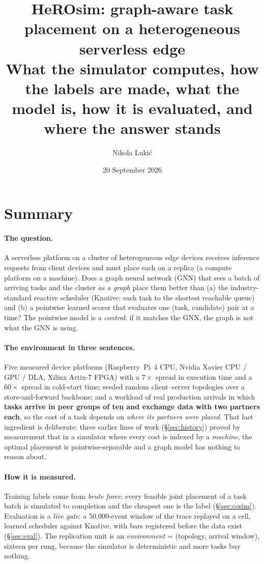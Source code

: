 \documentclass[11pt,a4paper]{article}
\title{HeROsim: graph-aware task placement on a heterogeneous serverless edge\\
\large What the simulator computes, how the labels are made, what the model is, how it is
evaluated, and where the answer stands}
\author{Nikola Luki\'c}
\date{20 September 2026}
\begin{document}
\maketitle

\section{Summary}

\paragraph{The question.} A serverless platform on a cluster of heterogeneous edge devices receives
inference requests from client devices and must place each on a replica (a compute platform on a
machine). Does a graph neural network (GNN) that sees a batch of arriving tasks and the cluster
\emph{as a graph} place them better than (a) the industry-standard reactive scheduler (Knative:
each task to the shortest reachable queue) and (b) a pointwise learned scorer that evaluates one
(task, candidate) pair at a time? The pointwise model is a \emph{control}: if it matches the GNN,
the graph is not what the GNN is using.

\paragraph{The environment in three sentences.} Five measured device platforms (Raspberry~Pi~4
CPU, Nvidia Xavier CPU / GPU / DLA, Xilinx Artix-7 FPGA) with a $7\times$ spread in execution time
and a $60\times$ spread in cold-start time; seeded random client--server topologies over a
store-and-forward backbone; and a workload of real production arrivals in which \textbf{tasks
arrive in peer groups of ten and exchange data with two partners each}, so the cost of a task
depends on \emph{where its partners were placed}. That last ingredient is deliberate: three earlier
lines of work (\S\ref{sec:history}) proved by measurement that in a simulator where every cost is
indexed by a \emph{machine}, the optimal placement is pointwise-separable and a graph model has
nothing to reason about.

\paragraph{How it is measured.} Training labels come from \emph{brute force}: every feasible joint
placement of a task batch is simulated to completion and the cheapest one is the label
(\S\ref{sec:cosim}). Evaluation is a \emph{live gate}: a 50{,}000-event window of the trace
replayed on a cell, learned scheduler against Knative, with bars registered before the data exist
(\S\ref{sec:eval}). The replication unit is an \emph{environment} = (topology, arrival window),
sixteen per rung, because the simulator is deterministic and more tasks buy nothing.
\end{document}
